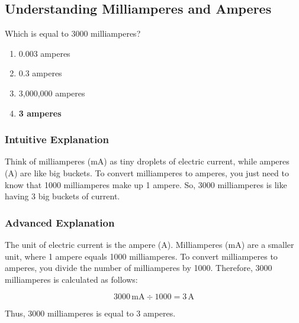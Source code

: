 \subsection{Understanding Milliamperes and Amperes}
\label{T5B06}

\begin{tcolorbox}[colback=gray!10!white,colframe=black!75!black,title=T5B06]
Which is equal to 3000 milliamperes?
\begin{enumerate}[noitemsep]
    \item 0.003 amperes
    \item 0.3 amperes
    \item 3,000,000 amperes
    \item \textbf{3 amperes}
\end{enumerate}
\end{tcolorbox}

\subsubsection*{Intuitive Explanation}
Think of milliamperes (mA) as tiny droplets of electric current, while amperes (A) are like big buckets. To convert milliamperes to amperes, you just need to know that 1000 milliamperes make up 1 ampere. So, 3000 milliamperes is like having 3 big buckets of current.

\subsubsection*{Advanced Explanation}
The unit of electric current is the ampere (A). Milliamperes (mA) are a smaller unit, where 1 ampere equals 1000 milliamperes. To convert milliamperes to amperes, you divide the number of milliamperes by 1000. Therefore, 3000 milliamperes is calculated as follows:

\[
3000 \, \text{mA} \div 1000 = 3 \, \text{A}
\]

Thus, 3000 milliamperes is equal to 3 amperes.